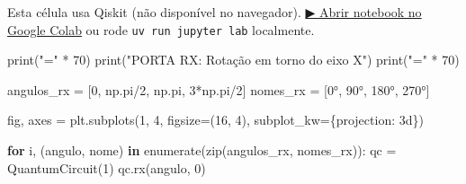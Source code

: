\documentclass[
  brazilian,
]{report}
\newenvironment{Shaded}{\begin{snugshade}}{\end{snugshade}}
\newcommand{\BuiltInTok}[1]{\textcolor[rgb]{0.00,0.23,0.31}{#1}}
\newcommand{\ControlFlowTok}[1]{\textcolor[rgb]{0.00,0.23,0.31}{\textbf{#1}}}
\newcommand{\DecValTok}[1]{\textcolor[rgb]{0.68,0.00,0.00}{#1}}
\newcommand{\KeywordTok}[1]{\textcolor[rgb]{0.00,0.23,0.31}{\textbf{#1}}}
\newcommand{\NormalTok}[1]{\textcolor[rgb]{0.00,0.23,0.31}{#1}}
\newcommand{\OperatorTok}[1]{\textcolor[rgb]{0.37,0.37,0.37}{#1}}
\newcommand{\StringTok}[1]{\textcolor[rgb]{0.13,0.47,0.30}{#1}}
\begin{document}
\begin{tcolorbox}[enhanced jigsaw, arc=.35mm, bottomrule=.15mm, bottomtitle=1mm, breakable, colback=white, colbacktitle=quarto-callout-warning-color!10!white, colframe=quarto-callout-warning-color-frame, coltitle=black, left=2mm, leftrule=.75mm, opacityback=0, opacitybacktitle=0.6, rightrule=.15mm, title=\textcolor{quarto-callout-warning-color}{\faExclamationTriangle}\hspace{0.5em}{⚛️ Célula Qiskit --- execute no Colab ou localmente}, titlerule=0mm, toprule=.15mm, toptitle=1mm]

Esta célula usa Qiskit (não disponível no navegador).
\href{https://colab.research.google.com/github/maxwellamaral/aula-quantum/blob/main/notebooks/00b-phases.ipynb}{▶
Abrir notebook no Google Colab} ou rode \texttt{uv\ run\ jupyter\ lab}
localmente.

\begin{Shaded}
\begin{Highlighting}[]

\BuiltInTok{print}\NormalTok{(}\StringTok{"="} \OperatorTok{*} \DecValTok{70}\NormalTok{)}
\BuiltInTok{print}\NormalTok{(}\StringTok{"PORTA RX: Rotação em torno do eixo X"}\NormalTok{)}
\BuiltInTok{print}\NormalTok{(}\StringTok{"="} \OperatorTok{*} \DecValTok{70}\NormalTok{)}

\NormalTok{angulos\_rx }\OperatorTok{=}\NormalTok{ [}\DecValTok{0}\NormalTok{, np.pi}\OperatorTok{/}\DecValTok{2}\NormalTok{, np.pi, }\DecValTok{3}\OperatorTok{*}\NormalTok{np.pi}\OperatorTok{/}\DecValTok{2}\NormalTok{]}
\NormalTok{nomes\_rx }\OperatorTok{=}\NormalTok{ [}\StringTok{\textquotesingle{}0°\textquotesingle{}}\NormalTok{, }\StringTok{\textquotesingle{}90°\textquotesingle{}}\NormalTok{, }\StringTok{\textquotesingle{}180°\textquotesingle{}}\NormalTok{, }\StringTok{\textquotesingle{}270°\textquotesingle{}}\NormalTok{]}

\NormalTok{fig, axes }\OperatorTok{=}\NormalTok{ plt.subplots(}\DecValTok{1}\NormalTok{, }\DecValTok{4}\NormalTok{, figsize}\OperatorTok{=}\NormalTok{(}\DecValTok{16}\NormalTok{, }\DecValTok{4}\NormalTok{), subplot\_kw}\OperatorTok{=}\NormalTok{\{}\StringTok{\textquotesingle{}projection\textquotesingle{}}\NormalTok{: }\StringTok{\textquotesingle{}3d\textquotesingle{}}\NormalTok{\})}

\ControlFlowTok{for}\NormalTok{ i, (angulo, nome) }\KeywordTok{in} \BuiltInTok{enumerate}\NormalTok{(}\BuiltInTok{zip}\NormalTok{(angulos\_rx, nomes\_rx)):}
\NormalTok{    qc }\OperatorTok{=}\NormalTok{ QuantumCircuit(}\DecValTok{1}\NormalTok{)}
\NormalTok{    qc.rx(angulo, }\DecValTok{0}\NormalTok{)}
    

\end{Highlighting}
\end{Shaded}
\end{tcolorbox}
\end{document}
